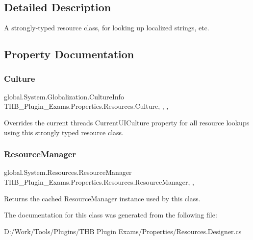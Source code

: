 \subsection{Detailed Description}
A strongly-\/typed resource class, for looking up localized strings, etc. 



\subsection{Property Documentation}
\mbox{\label{class_t_h_b___plugin___exams_1_1_properties_1_1_resources_ad00eb8a1a616471660b17263b4e580ad}} 
\subsubsection{\texorpdfstring{Culture}{Culture}}
{\footnotesize\ttfamily global.\+System.\+Globalization.\+Culture\+Info T\+H\+B\+\_\+\+Plugin\+\_\+\+Exams.\+Properties.\+Resources.\+Culture\hspace{0.3cm}{\ttfamily [static]}, {\ttfamily [get]}, {\ttfamily [set]}, {\ttfamily [package]}}



Overrides the current thread\textquotesingle{}s Current\+U\+I\+Culture property for all resource lookups using this strongly typed resource class. 

\mbox{\label{class_t_h_b___plugin___exams_1_1_properties_1_1_resources_ac94e7ac51e431c417ddd588992ec389f}} 
\subsubsection{\texorpdfstring{Resource\+Manager}{ResourceManager}}
{\footnotesize\ttfamily global.\+System.\+Resources.\+Resource\+Manager T\+H\+B\+\_\+\+Plugin\+\_\+\+Exams.\+Properties.\+Resources.\+Resource\+Manager\hspace{0.3cm}{\ttfamily [static]}, {\ttfamily [get]}, {\ttfamily [package]}}



Returns the cached Resource\+Manager instance used by this class. 



The documentation for this class was generated from the following file\+:\begin{DoxyCompactItemize}
\item 
D\+:/\+Work/\+Tools/\+Plugins/\+T\+H\+B Plugin Exams/\+Properties/Resources.\+Designer.\+cs\end{DoxyCompactItemize}
